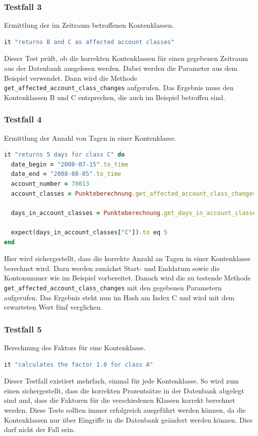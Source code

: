\documentclass[12pt]{scrreprt}
\begin{document}
\subsubsection{Testfall 3}
Ermittlung der im Zeitraum betroffenen Kontenklassen.
\begin{lstlisting}[language=Ruby]
it "returns B and C as affected account classes"
\end{lstlisting}
Dieser Test prüft, ob die korrekten Kontenklassen für einen gegebenen Zeitraum aus der Datenbank ausgelesen werden. Dabei werden die Parameter aus dem Beispiel verwendet. Dann wird die Methode \verb+get_affected_account_class_changes+ aufgerufen. Das Ergebnis muss den Kontenklassen B und C entsprechen, die auch im Beispiel betroffen sind.

\subsubsection{Testfall 4}
Ermittlung der Anzahl von Tagen in einer Kontenklasse.
\begin{lstlisting}[language=Ruby]
it "returns 5 days for class C" do
  date_begin = "2008-07-15".to_time
  date_end = "2008-08-05".to_time
  account_number = 70013
  account_classes = Punkteberechnung.get_affected_account_class_changes(date_begin, date_end, account_number)
  
  days_in_account_classes = Punkteberechnung.get_days_in_account_classes(account_classes, date_begin, date_end)
  
  expect(days_in_account_classes["C"]).to eq 5
end 
\end{lstlisting}
Hier wird sichergestellt, dass die korrekte Anzahl an Tagen in einer Kontenklasse berechnet wird. Dazu werden zunächst Start- und Enddatum sowie die Kontonummer wie im Beispiel vorbereitet. Danach wird die zu testende Methode \newline\verb+get_affected_account_class_changes+ mit den gegebenen Parametern aufgerufen. Das Ergebnis steht nun im Hash am Index C und wird mit dem erwarteten Wert fünf verglichen.

\subsubsection{Testfall 5}
Berechnung des Faktors für eine Kontenklasse.
\begin{lstlisting}[language=Ruby]
it "calculates the factor 1.0 for class A"
\end{lstlisting}
Dieser Testfall existiert mehrfach, einmal für jede Kontenklasse. So wird zum einen sichergestellt, dass die korrekten Prozentsätze in der Datenbank abgelegt sind und, dass die Faktoren für die verschiedenen Klassen korrekt berechnet werden. Diese Tests sollten immer erfolgreich ausgeführt werden können, da die Kontenklassen nur über Eingriffe in die Datenbank geändert werden können. Dies darf nicht der Fall sein. 
\end{document}
